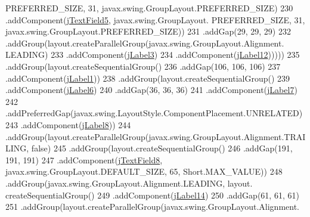 \begin{DoxyCode}
      PREFERRED\_SIZE, 31, javax.swing.GroupLayout.PREFERRED\_SIZE)
230                                         .addComponent(\mbox{\hyperlink{classsoftware_1_1parasoftware3_acd863025f5ab774c7139623c6dab2f9b}{jTextField5}}, javax.swing.GroupLayout.
      PREFERRED\_SIZE, 31, javax.swing.GroupLayout.PREFERRED\_SIZE))
231                                     .addGap(29, 29, 29)
232                                     .addGroup(layout.createParallelGroup(javax.swing.GroupLayout.Alignment.
      LEADING)
233                                         .addComponent(\mbox{\hyperlink{classsoftware_1_1parasoftware3_a62ceb2511ec08ce64863778ec683c2ef}{jLabel3}})
234                                         .addComponent(\mbox{\hyperlink{classsoftware_1_1parasoftware3_abbd12b5ff66390642a8541054290bc50}{jLabel12}})))))
235                         .addGroup(layout.createSequentialGroup()
236                             .addGap(106, 106, 106)
237                             .addComponent(\mbox{\hyperlink{classsoftware_1_1parasoftware3_ae1871baf2f1bc751040bce3b2dc970c1}{jLabel1}}))
238                         .addGroup(layout.createSequentialGroup()
239                             .addComponent(\mbox{\hyperlink{classsoftware_1_1parasoftware3_a4afbf232c47d3ab6c0aaf0ae394219bf}{jLabel6}})
240                             .addGap(36, 36, 36)
241                             .addComponent(\mbox{\hyperlink{classsoftware_1_1parasoftware3_a244f99c3af34ae7b3a9046d6efc18a95}{jLabel7}})
242                             .addPreferredGap(javax.swing.LayoutStyle.ComponentPlacement.UNRELATED)
243                             .addComponent(\mbox{\hyperlink{classsoftware_1_1parasoftware3_aa6b9c08a2dd3c58649ccab6707950e45}{jLabel8}}))
244                         .addGroup(layout.createParallelGroup(javax.swing.GroupLayout.Alignment.TRAILING, \textcolor{keyword}{
      false})
245                             .addGroup(layout.createSequentialGroup()
246                                 .addGap(191, 191, 191)
247                                 .addComponent(\mbox{\hyperlink{classsoftware_1_1parasoftware3_a1be214ec91e03d8a319ac31581cd559f}{jTextField8}}, javax.swing.GroupLayout.DEFAULT\_SIZE,
       65, Short.MAX\_VALUE))
248                             .addGroup(javax.swing.GroupLayout.Alignment.LEADING, layout.
      createSequentialGroup()
249                                 .addComponent(\mbox{\hyperlink{classsoftware_1_1parasoftware3_a8cf21f19b1d00a92b53875d6c27aed2f}{jLabel14}})
250                                 .addGap(61, 61, 61)
251                                 .addGroup(layout.createParallelGroup(javax.swing.GroupLayout.Alignment.

\end{DoxyCode}
